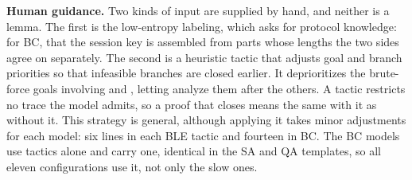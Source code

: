 \noindent\textbf{Human guidance.}
Two kinds of input are supplied by hand, and neither is a lemma.
The first is the low-entropy labeling, which asks for protocol knowledge: for BC, that the session
key is assembled from parts whose lengths the two sides agree on separately.
The second is a heuristic tactic that adjusts goal and branch priorities so that infeasible
branches are closed earlier. It deprioritizes the brute-force goals involving  and
, letting \Tamarin{} analyze them after the others. A tactic restricts no trace
the model admits, so a proof that closes means the same with it as without it.
This strategy is general, although applying it takes minor adjustments for each model: six lines
in each BLE tactic and fourteen in BC. The BC models use tactics alone and carry one, identical in
the SA and QA templates, so all eleven configurations use it, not only the slow ones.

